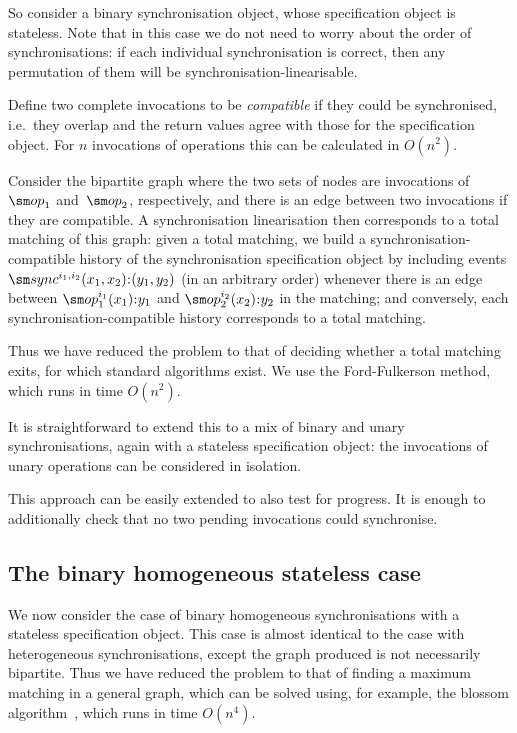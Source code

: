 So consider a binary synchronisation object, whose specification object is
stateless.  Note that in this case we do not need to worry about the order of
synchronisations: if each individual synchronisation is correct, then any
permutation of them will be synchronisation-linearisable.

Define two complete invocations to be \emph{compatible} if they could be
synchronised, i.e.~they overlap and the return values agree with those for the
specification object.  For $n$ invocations of operations this can be
calculated in $O(n^2)$.

Consider the bipartite graph where the two sets of nodes are invocations
of~$\op_1$ and~$\op_2$, respectively, and there is an edge between two
invocations if they are compatible.  A synchronisation linearisation then
corresponds to a total matching of this graph: given a total matching, we
build a synchronisation-compatible history of the synchronisation
specification object by including events
$\sync^{i_1,i_2}(x_1,x_2)\::(y_1,y_2)$ (in an arbitrary order) whenever there
is an edge between $\op_1^{i_1}(x_1)\::y_1$ and $\op_2^{i_2}(x_2)\::y_2$ in
the matching; and conversely, each synchronisation-compatible history
corresponds to a total matching.

Thus we have reduced the problem to that of deciding whether a total matching
exits, for which standard algorithms exist.  We use the Ford-Fulkerson method,
which runs in time $O(n^2)$.

It is straightforward to extend this to a mix of binary and unary
synchronisations, again with a stateless specification object: the invocations
of unary operations can be considered in isolation.  

This approach can be easily extended to also test for progress.  It is enough
to additionally check that no two pending invocations could synchronise.


\subsection{The binary homogeneous stateless case}
\label{sec:binary-homogeneous} 

We now consider the case of binary homogeneous synchronisations with a
stateless specification object.  This case is almost identical to the case
with heterogeneous synchronisations, except the graph produced is not
necessarily bipartite.  Thus we have reduced the problem to that of finding a
maximum matching in a general graph, which can be solved using, for example,
the blossom algorithm~\cite{edmonds_1965}, which runs in time $O(n^4)$.
  

